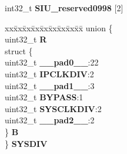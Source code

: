 \begin{DoxyCompactItemize}
\begin{tabbing}
\end{tabbing}\item 
\mbox{\label{structSIU__tag_a273a32485f87c355e1a2657016c1e183}} 
int32\+\_\+t {\bfseries S\+I\+U\+\_\+reserved0998} \mbox{[}2\mbox{]}
\item 
\mbox{\label{structSIU__tag_aa76fd1fc0f6025c8af88d788bba802e3}} 
\begin{tabbing}
xx\=xx\=xx\=xx\=xx\=xx\=xx\=xx\=xx\=\kill
union \{\\
\>uint32\_t {\bfseries R}\\
\>struct \{\\
\>\>uint32\_t {\bfseries \_\_pad0\_\_}:22\\
\>\>uint32\_t {\bfseries IPCLKDIV}:2\\
\>\>uint32\_t {\bfseries \_\_pad1\_\_}:3\\
\>\>uint32\_t {\bfseries BYPASS}:1\\
\>\>uint32\_t {\bfseries SYSCLKDIV}:2\\
\>\>uint32\_t {\bfseries \_\_pad2\_\_}:2\\
\>\} {\bfseries B}\\
\} {\bfseries SYSDIV}\\


\end{tabbing}
\end{DoxyCompactItemize}
